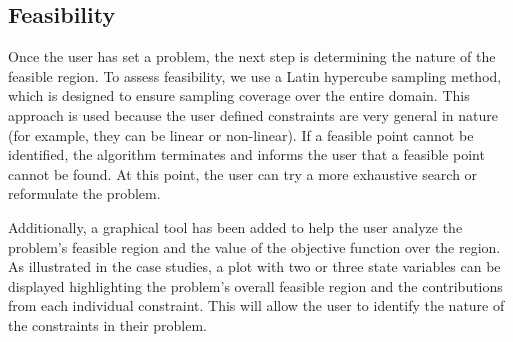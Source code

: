 \documentclass[10pt]{article}
\begin{document}
\subsection{Feasibility}
\label{subsec:Feasibility}

Once the user has set a problem, the next step is determining the nature of the feasible region.  To assess feasibility, we use a Latin hypercube sampling method, which is designed to ensure sampling coverage over the entire domain.  This approach is used because the user defined constraints are very general in nature (for example, they can be linear or non-linear).  If a feasible point cannot be identified, the algorithm terminates and informs the user that a feasible point cannot be found.  At this point, the user can try a more exhaustive search or reformulate the problem.

Additionally, a graphical tool has been added to help the user analyze the problem's feasible region and the value of the objective function over the region.  As illustrated in the case studies, a plot with two or three state variables can be displayed highlighting the problem's overall feasible region and the contributions from each individual constraint.  This will allow the user to identify the nature of the constraints in their problem.
\end{document}
